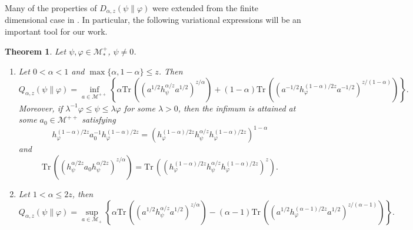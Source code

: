 \documentclass[12pt]{article}
\newtheorem{theorem}{Theorem}
\theoremstyle{definition}
\theoremstyle{remark}
\def\Me{\mathcal M}
\def \Tr{\mathrm{Tr}\,}
\begin{document}
Many of the  properties of $D_{\alpha,z}(\psi\|\varphi)$ 
were extended from the finite dimensional case in \cite{kato2023onrenyi}. In particular,
the following variational expressions will be an important tool for our work.

\begin{theorem}\label{thm:variational} Let $\psi,\varphi\in \Me_*^+$, $\psi\ne 0$. 
\begin{enumerate}
\item[(i)] Let $0<\alpha<1$ and $\max\{\alpha,1-\alpha\}\le z$. Then
\[
Q_{\alpha,z}(\psi\|\varphi)=\inf_{a\in \Me^{++}}\left\{\alpha
\Tr\left((a^{1/2}h_\psi^{\alpha/z}a^{1/2})^{z/\alpha}\right)+(1-\alpha)
\Tr\left((a^{-1/2}h_\varphi^{(1-\alpha)/2z}a^{-1/2})^{z/(1-\alpha)}\right) \right\}.
\]
Moreover, if $\lambda^{-1}\varphi\le \psi\le \lambda \varphi$ for some $\lambda>0$, then
the infimum is attained at some $a_0\in \Me^{++}$ satisfying
\[
h_\varphi^{(1-\alpha)/2z}a_0^{-1}h_\varphi^{(1-\alpha)/2z}=\left(h_\varphi^{(1-\alpha)/2z}h_\psi^{\alpha/z}h_\varphi^{(1-\alpha)/2z}\right)^{1-\alpha}
\]
and
\[
\Tr\left((h_\psi^{\alpha/2z}a_0h_\psi^{\alpha/2z})^{z/\alpha}\right)=
\Tr\left((h_\varphi^{(1-\alpha)/2z}h_\psi^{\alpha/z}h_\varphi^{(1-\alpha)/2z})^{z}\right).
\]
\item[(ii)] Let $1<\alpha\le 2z$, then
\[
Q_{\alpha,z}(\psi\|\varphi)=\sup_{a\in \Me_+} \left\{\alpha
\Tr\left((a^{1/2}h_\psi^{\alpha/z}a^{1/2})^{z/\alpha}\right)-(\alpha-1)
\Tr\left((a^{1/2}h_\varphi^{(\alpha-1)/2z}a^{1/2})^{z/(\alpha-1)}\right) \right\}.
\]

\end{enumerate}


\end{theorem}
\end{document}

